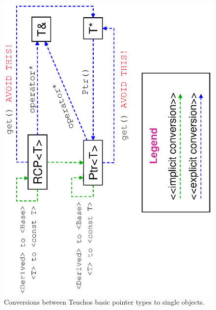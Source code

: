 \begin{itemize}
{\bsinglespace
\begin{figure}[p]
\begin{center}
\includegraphics*[angle=270,scale=0.65
]{TeuchosPtrConversions}
\end{center}
\caption{
\label{TeuchosPtrConversions}
Conversions between Teuchos basic pointer types to single objects.  }
\end{figure}
\esinglespace}



\end{itemize}
